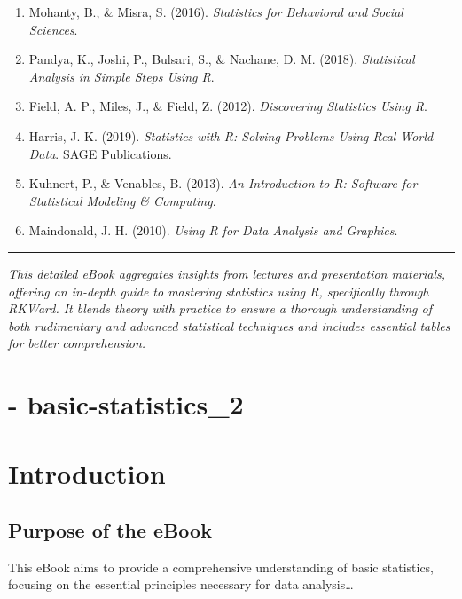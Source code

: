 \documentclass[
  letterpaper,
  DIV=11,
  numbers=noendperiod]{scrreprt}
\providecommand{\tightlist}{%
  \setlength{\itemsep}{0pt}\setlength{\parskip}{0pt}}
\begin{document}
\begin{enumerate}
\def\labelenumi{\arabic{enumi}.}
\tightlist
\item
  Mohanty, B., \& Misra, S. (2016). \emph{Statistics for Behavioral and
  Social Sciences}.
\item
  Pandya, K., Joshi, P., Bulsari, S., \& Nachane, D. M. (2018).
  \emph{Statistical Analysis in Simple Steps Using R}.
\item
  Field, A. P., Miles, J., \& Field, Z. (2012). \emph{Discovering
  Statistics Using R}.
\item
  Harris, J. K. (2019). \emph{Statistics with R: Solving Problems Using
  Real-World Data}. SAGE Publications.
\item
  Kuhnert, P., \& Venables, B. (2013). \emph{An Introduction to R:
  Software for Statistical Modeling \& Computing}.
\item
  Maindonald, J. H. (2010). \emph{Using R for Data Analysis and
  Graphics}.
\end{enumerate}

\begin{center}\rule{0.5\linewidth}{0.5pt}\end{center}

\emph{This detailed eBook aggregates insights from lectures and
presentation materials, offering an in-depth guide to mastering
statistics using R, specifically through RKWard. It blends theory with
practice to ensure a thorough understanding of both rudimentary and
advanced statistical techniques and includes essential tables for better
comprehension.}


\chapter{- basic-statistics\_2}\label{basic-statistics_2}


\chapter{Introduction}\label{introduction-3}

\section{Purpose of the eBook}\label{purpose-of-the-ebook}

This eBook aims to provide a comprehensive understanding of basic
statistics, focusing on the essential principles necessary for data
analysis\ldots{}
\end{document}
